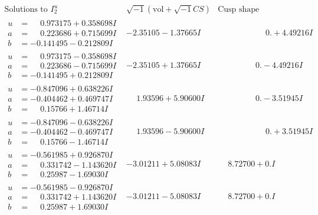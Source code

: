 \documentclass[1p]{elsarticle_modified}
\theoremstyle{definition}
\newcommand{\I}{\sqrt{-1}}
\begin{document}
$$\begin{array}{c|c|c}  
\text{Solutions to }I^u_{2}& \I (\text{vol} + \sqrt{-1}CS) & \text{Cusp shape}\\
 \hline 
\begin{aligned}
u &= \phantom{-}0.973175 + 0.358698 I \\
a &= \phantom{-}0.223686 + 0.715699 I \\
b &= -0.141495 - 0.212809 I\end{aligned}
 & -2.35105 - 1.37665 I & \phantom{-0.000000 -}0. + 4.49216 I \\ \hline\begin{aligned}
u &= \phantom{-}0.973175 - 0.358698 I \\
a &= \phantom{-}0.223686 - 0.715699 I \\
b &= -0.141495 + 0.212809 I\end{aligned}
 & -2.35105 + 1.37665 I & \phantom{-0.000000 } 0. - 4.49216 I \\ \hline\begin{aligned}
u &= -0.847096 + 0.638226 I \\
a &= -0.404462 + 0.469747 I \\
b &= \phantom{-}0.15766 + 1.46714 I\end{aligned}
 & \phantom{-}1.93596 + 5.90600 I & \phantom{-0.000000 } 0. - 3.51945 I \\ \hline\begin{aligned}
u &= -0.847096 - 0.638226 I \\
a &= -0.404462 - 0.469747 I \\
b &= \phantom{-}0.15766 - 1.46714 I\end{aligned}
 & \phantom{-}1.93596 - 5.90600 I & \phantom{-0.000000 -}0. + 3.51945 I \\ \hline\begin{aligned}
u &= -0.561985 + 0.926870 I \\
a &= \phantom{-}0.331742 - 1.143620 I \\
b &= \phantom{-}0.25987 - 1.69030 I\end{aligned}
 & -3.01211 + 5.08083 I & \phantom{-}8.72700 + 0. I\phantom{ +0.000000I} \\ \hline\begin{aligned}
u &= -0.561985 - 0.926870 I \\
a &= \phantom{-}0.331742 + 1.143620 I \\
b &= \phantom{-}0.25987 + 1.69030 I\end{aligned}
 & -3.01211 - 5.08083 I & \phantom{-}8.72700 + 0. I\phantom{ +0.000000I} \\ \hline\begin{aligned}

\end{aligned}
\end{array}$$
\end{document}
